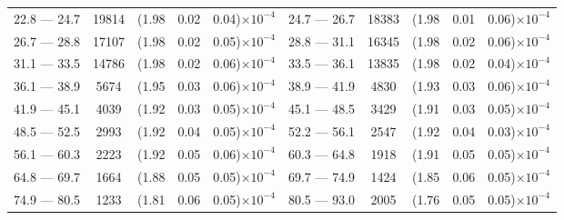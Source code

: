 \begin{table}[p]
\begin{tabular}{c|c|ccc  c|c|ccc}
22.8 — 24.7  &  19814                &(1.98                                &  0.02                   &      0.04)$\times 10^{-4}$  & 24.7 — 26.7  &  18383                 &(1.98                                &  0.01                   &      0.06)$\times 10^{-4}$ \\
26.7 — 28.8  &  17107                &(1.98                                &  0.02                   &      0.05)$\times 10^{-4}$  & 28.8 — 31.1  &  16345                 &(1.98                                &  0.02                   &      0.06)$\times 10^{-4}$ \\
31.1 — 33.5  &  14786                &(1.98                                &  0.02                   &      0.06)$\times 10^{-4}$  & 33.5 — 36.1  &  13835                 &(1.98                                &  0.02                   &      0.04)$\times 10^{-4}$ \\
36.1 — 38.9  &  5674                  &(1.95                                &  0.03                   &      0.06)$\times 10^{-4}$  & 38.9 — 41.9  &  4830                   &(1.93                                &  0.03                   &      0.06)$\times 10^{-4}$ \\
41.9 — 45.1  &  4039                  &(1.92                                &  0.03                   &      0.05)$\times 10^{-4}$  & 45.1 — 48.5  &  3429                   &(1.91                                &  0.03                   &      0.05)$\times 10^{-4}$ \\
48.5 — 52.5  &  2993                  &(1.92                                &  0.04                   &      0.05)$\times 10^{-4}$  & 52.2 — 56.1  &  2547                   &(1.92                                &  0.04                   &      0.03)$\times 10^{-4}$ \\
56.1 — 60.3  &  2223                  &(1.92                                &  0.05                   &      0.06)$\times 10^{-4}$  & 60.3 — 64.8  &  1918                   &(1.91                                &  0.05                   &      0.05)$\times 10^{-4}$ \\
64.8 — 69.7  &  1664                  &(1.88                                &  0.05                   &      0.05)$\times 10^{-4}$  & 69.7 — 74.9  &  1424                   &(1.85                                &  0.06                   &      0.05)$\times 10^{-4}$ \\
74.9 — 80.5  &  1233                  &(1.81                                &  0.06                   &      0.05)$\times 10^{-4}$  & 80.5 — 93.0  &  2005                   &(1.76                                &  0.05                   &      0.05)$\times 10^{-4}$ \\

\end{tabular}
\end{table}
